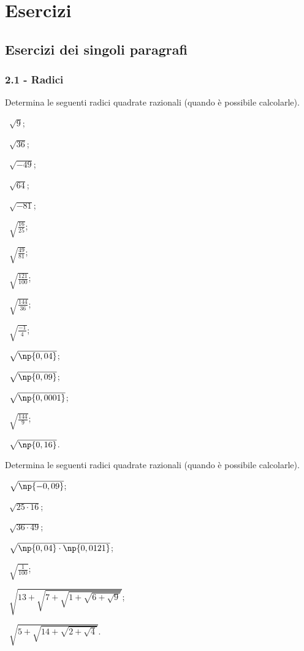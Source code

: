 \section{Esercizi}
\subsection{Esercizi dei singoli paragrafi}
\subsubsection*{2.1 - Radici}


\begin{esercizio}
 \label{ese:2.1}
Determina le seguenti radici quadrate razionali (quando è possibile calcolarle).
\begin{multicols}{3}
 \begin{enumeratea}
 \item~$\sqrt 9$;
 \item~$\sqrt{36}$;
 \item~$\sqrt{-49}$;
 \item~$\sqrt{64}$;
 \item~$\sqrt{-81}$;
 \item~$\sqrt{\frac{16}{25}}$;
 \item~$\sqrt{\frac{49}{81}}$;
 \item~$\sqrt{\frac{121}{100}}$;
 \item~$\sqrt{\frac{144}{36}}$;
 \item~$\sqrt{\frac{-1} 4}$;
 \item~$\sqrt{\np{0,04}}$;
 \item~$\sqrt{\np{0,09}}$;
 \item~$\sqrt{\np{0,0001}}$;
 \item~$\sqrt{\frac{144} 9}$;
 \item~$\sqrt{\np{0,16}}$.
 \end{enumeratea}
 \end{multicols}
\end{esercizio}

\begin{esercizio}
 \label{ese:2.2}
Determina le seguenti radici quadrate razionali (quando è possibile calcolarle).
\begin{multicols}{2}
 \begin{enumeratea}
 \item~$\sqrt{\np{-0,09}}$;
 \item~$\sqrt{25\cdot 16}$;
 \item~$\sqrt{36\cdot 49}$;
 \item~$\sqrt{\np{0,04}\cdot \np{0,0121}}$;
 \item~$\sqrt{\frac 1{100}}$;
 \item~$\sqrt{13+\sqrt{7+\sqrt{1+\sqrt{6+\sqrt 9}}}}$;
 \item~$\sqrt{5+\sqrt{14+\sqrt{2+\sqrt 4}}}$.
 \end{enumeratea}
 \end{multicols}
\end{esercizio}

